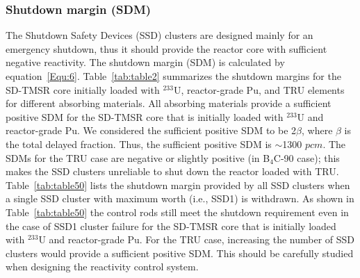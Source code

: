 \subsubsection{Shutdown margin (SDM)}

The Shutdown Safety Devices (SSD) clusters are designed mainly for an emergency shutdown, thus it should 
provide the reactor core with sufficient negative reactivity. The 
shutdown margin (SDM) is calculated by equation~\ref{Equ:6}.
Table~\ref{tab:table2} summarizes the shutdown margins for the SD-TMSR core 
initially loaded with $^{233}$U, reactor-grade Pu, and TRU 
elements for different absorbing materials. All absorbing materials provide a sufficient positive
SDM for the SD-TMSR core that is initially loaded with 
$^{233}$U and reactor-grade Pu. We considered the sufficient positive SDM to be 2$\beta$, where $\beta$ is the total delayed fraction. Thus, the sufficient positive SDM is $\sim$1300 $pcm$. The SDMs for the TRU case are 
negative or slightly positive (in B$_4$C-90 case); this makes the SSD clusters 
unreliable to shut down the reactor loaded with TRU. Table~\ref{tab:table50} lists the shutdown margin provided by all SSD clusters when a single SSD cluster with maximum worth (i.e., SSD1) is withdrawn. As shown in Table~\ref{tab:table50} the control rods still meet the shutdown requirement even in the case of SSD1 cluster failure for the SD-TMSR core that is initially loaded with $^{233}$U and reactor-grade Pu. For the TRU case, increasing the number of SSD clusters would provide a sufficient positive SDM. This should be carefully studied when designing the reactivity control system. 

